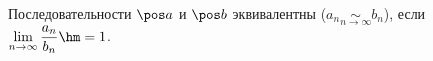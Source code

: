 
    Последовательности $\pos a$ и $\pos b$ эквивалентны ($a_n\underset{n\to\infty}{\sim} b_n$),
     если $\lim\limits_{n\to\infty}\dfrac{a_n}{b_n}\hm=1$.
